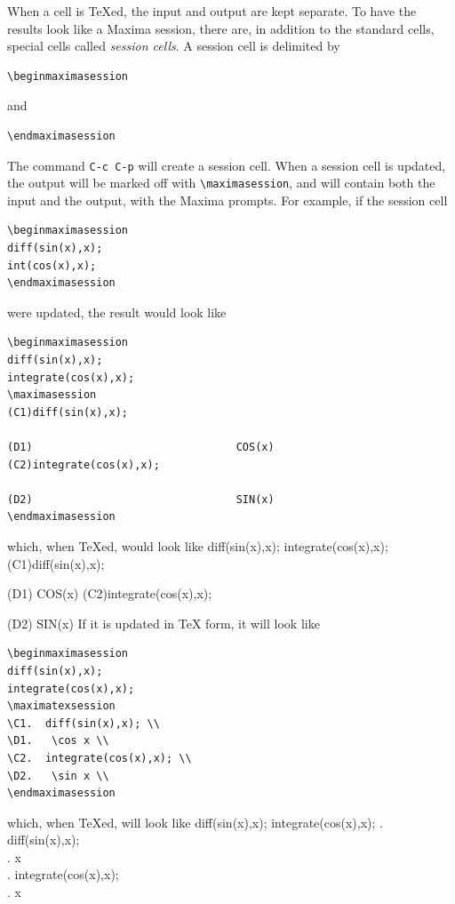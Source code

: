 \noindent
When a cell is \TeX{}ed, the input and output are kept separate.  To
have the results look like a Maxima session, there are, in addition to
the standard cells, special cells called \emph{session cells}.   A
session cell is delimited by
\begin{verbatim}
\beginmaximasession
\end{verbatim}
\noindent
and
\begin{verbatim}
\endmaximasession
\end{verbatim}
\noindent
The command \texttt{C-c C-p} will create a session cell.  When a
session cell is updated, the output will be marked off with
\verb+\maximasession+, and will contain both the input and the output,
with the Maxima prompts.  For example, if the session cell
\begin{verbatim}
\beginmaximasession
diff(sin(x),x);
int(cos(x),x);
\endmaximasession
\end{verbatim}
\noindent
were updated, the result would look like
\begin{verbatim}
\beginmaximasession
diff(sin(x),x);
integrate(cos(x),x);
\maximasession
(C1)diff(sin(x),x);

(D1)                                COS(x)
(C2)integrate(cos(x),x);

(D2)                                SIN(x)
\endmaximasession
\end{verbatim}
\noindent
which, when \TeX{}ed, would look like
\beginmaximasession
diff(sin(x),x);
integrate(cos(x),x);
\maximasession
(C1)diff(sin(x),x);

(D1)                                COS(x)
(C2)integrate(cos(x),x);

(D2)                                SIN(x)
\endmaximasession
\noindent
If it is updated in \TeX{} form, it will look like
\begin{verbatim}
\beginmaximasession
diff(sin(x),x);
integrate(cos(x),x);
\maximatexsession
\C1.  diff(sin(x),x); \\
\D1.   \cos x \\
\C2.  integrate(cos(x),x); \\
\D2.   \sin x \\
\endmaximasession
\end{verbatim}
\noindent
which, when \TeX{}ed, will look like
\beginmaximasession
diff(sin(x),x);
integrate(cos(x),x);
\maximatexsession
{}.  diff(sin(x),x); \\
.   \cos x \\
.  integrate(cos(x),x); \\
.   \sin x \\
\endmaximasession

